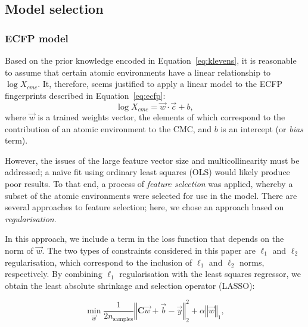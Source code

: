 \subsection{Model selection}

\subsubsection{ECFP model}

Based on the prior knowledge encoded in Equation~\ref{eq:klevens}, it is
reasonable to assume that certain atomic environments have a linear relationship to $\log X_{cmc}$. It, therefore, seems justified to apply a linear model to the ECFP fingerprints described in Equation~\ref{eq:ecfp}:
\begin{equation}
    \label{eq:linear-ecfp}
    \log X_{cmc} = \vec{w} \cdot \vec{c} + b,
\end{equation}
where $\vec{w}$ is a trained weights vector, the elements of which correspond to the contribution of an atomic environment to the CMC, and $b$ is an intercept (or \emph{bias} term).

However, the issues of the large feature vector size and multicollinearity must be addressed; a na\"ive fit using ordinary least squares (OLS) would likely produce poor results. To that end, a process of \emph{feature selection} was
applied, whereby a subset of the atomic environments were selected for use in the model. There are several approaches to feature selection\cite{liFeatureSelectionData2017}; here, we chose an approach based on \emph{regularisation}.

In this approach, we include a term in the loss function that depends on the norm of $\vec{w}$. The two types of constraints considered in this paper are $\ell_1$ and $\ell_2$ regularisation, which correspond to the inclusion of
$\ell_1$ and $\ell_2$ norms, respectively. By combining $\ell_1$ regularisation with the least squares regressor, we obtain the least absolute shrinkage and selection operator (LASSO)\cite{tibshiraniRegressionShrinkageSelection1996}:

\begin{equation}
    \min_{\vec{w}} { \frac{1}{2n_{\text{samples}}} \left \Vert \mathbf{C}\vec{w} + \vec{b} - \vec{y} \right \Vert_2 ^ 2 + \alpha \left \Vert \vec{w} \right \Vert_1},
\end{equation}


